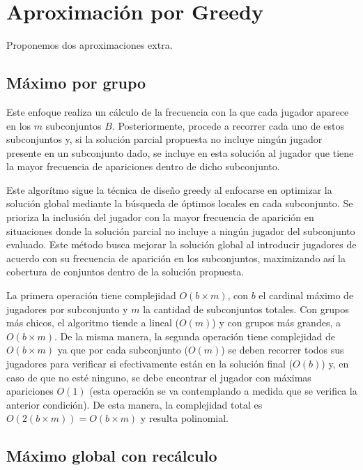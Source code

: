 \section{Aproximación por Greedy}

Proponemos dos aproximaciones extra.

\subsection{Máximo por grupo}
Este enfoque realiza un cálculo de la frecuencia con la que cada jugador aparece en los $m$ subconjuntos $B$. Posteriormente, procede a recorrer cada uno de estos subconjuntos y, si la solución parcial propuesta no incluye ningún jugador presente en un subconjunto dado, se incluye en esta solución al jugador que tiene la mayor frecuencia de apariciones dentro de dicho subconjunto.

Este algorítmo sigue la técnica de diseño greedy al enfocarse en optimizar la solución global mediante la búsqueda de óptimos locales en cada subconjunto. Se prioriza la inclusión del jugador con la mayor frecuencia de aparición en situaciones donde la solución parcial no incluye a ningún jugador del subconjunto evaluado. Este método busca mejorar la solución global al introducir jugadores de acuerdo con su frecuencia de aparición en los subconjuntos, maximizando así la cobertura de conjuntos dentro de la solución propuesta.



La primera operación tiene complejidad $O(b \times m)$, con $b$ el cardinal máximo de jugadores por subconjunto y $m$ la cantidad de subconjuntos totales. Con grupos más chicos, el algoritmo tiende a lineal ($O(m)$) y con grupos más grandes, a $O(b\times m)$. 
De la misma manera, la segunda operación tiene complejidad de  $O(b\times m)$ ya que por cada subconjunto ($O(m)$) se deben recorrer todos sus jugadores para verificar si efectivamente están en la solución final ($O(b)$) y, en caso de que no esté ninguno, se debe encontrar el jugador con máximas apariciones $O(1)$ (esta operación se va contemplando a medida que se verifica la anterior condición). De esta manera, la complejidad total es $O(2(b \times m))=O(b \times m)$ y resulta polinomial.

\subsection{Máximo global con recálculo}

